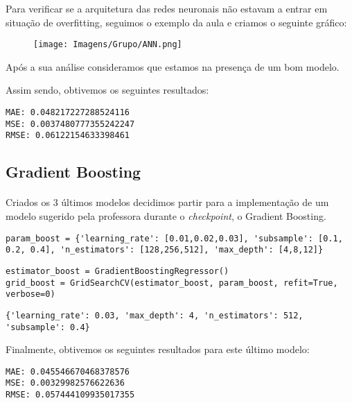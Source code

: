 Para verificar se a arquitetura das redes neuronais não estavam a entrar em situação de overfitting, seguimos o exemplo da aula e criamos o seguinte gráfico:

\begin{figure}[H]
    \centering
    \centerline{\texttt{[image: Imagens/Grupo/ANN.png]}}
    \label{fig: ANN}
\end{figure}

Após a sua análise consideramos que estamos na presença de um bom modelo.

Assim sendo, obtivemos os seguintes resultados:
\begin{verbatim}
MAE: 0.048217227288524116
MSE: 0.0037480777355242247
RMSE: 0.06122154633398461
\end{verbatim}

\subsection{Gradient Boosting}
\paragraph{}
Criados os 3 últimos modelos decidimos partir para a implementação de um modelo sugerido pela professora durante o \textit{checkpoint}, o Gradient Boosting.

\begin{verbatim}
param_boost = {'learning_rate': [0.01,0.02,0.03], 'subsample': [0.1, 0.2, 0.4], 'n_estimators': [128,256,512], 'max_depth': [4,8,12]}
\end{verbatim}

\begin{verbatim}
estimator_boost = GradientBoostingRegressor()
grid_boost = GridSearchCV(estimator_boost, param_boost, refit=True, verbose=0)
\end{verbatim}

\begin{verbatim}
{'learning_rate': 0.03, 'max_depth': 4, 'n_estimators': 512, 'subsample': 0.4}
\end{verbatim}

Finalmente, obtivemos os seguintes resultados para este último modelo:
\begin{verbatim}
MAE: 0.045546670468378576
MSE: 0.00329982576622636
RMSE: 0.057444109935017355
\end{verbatim}

